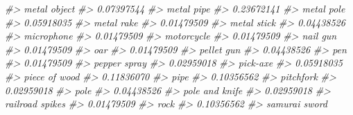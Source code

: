 \documentclass[
]{krantz}
\makeatletter
\newenvironment{Shaded}{\begin{snugshade}}{\end{snugshade}}
\newcommand{\CommentTok}[1]{\textcolor[rgb]{0.37,0.37,0.37}{\textit{#1}}}
\newenvironment{kframe}{%
\medskip{}
\setlength{\fboxsep}{.8em}
 \def\at@end@of@kframe{}%
 \ifinner\ifhmode%
  \def\at@end@of@kframe{\end{minipage}}%
  \begin{minipage}{\columnwidth}%
 \fi\fi%
 \def\FrameCommand##1{\hskip\@totalleftmargin \hskip-\fboxsep
 \colorbox{shadecolor}{##1}\hskip-\fboxsep
     \hskip-\linewidth \hskip-\@totalleftmargin \hskip\columnwidth}%
 \MakeFramed {\advance\hsize-\width
   \@totalleftmargin\z@ \linewidth\hsize
   \@setminipage}}%
 {\par\unskip\endMakeFramed%
 \at@end@of@kframe}
\renewenvironment{Shaded}{\begin{kframe}}{\end{kframe}}
\makeatother
\begin{document}
\begin{Shaded}
\begin{Highlighting}[]
\CommentTok{\#\textgreater{}                     metal object }
\CommentTok{\#\textgreater{}                       0.07397544 }
\CommentTok{\#\textgreater{}                       metal pipe }
\CommentTok{\#\textgreater{}                       0.23672141 }
\CommentTok{\#\textgreater{}                       metal pole }
\CommentTok{\#\textgreater{}                       0.05918035 }
\CommentTok{\#\textgreater{}                       metal rake }
\CommentTok{\#\textgreater{}                       0.01479509 }
\CommentTok{\#\textgreater{}                      metal stick }
\CommentTok{\#\textgreater{}                       0.04438526 }
\CommentTok{\#\textgreater{}                       microphone }
\CommentTok{\#\textgreater{}                       0.01479509 }
\CommentTok{\#\textgreater{}                       motorcycle }
\CommentTok{\#\textgreater{}                       0.01479509 }
\CommentTok{\#\textgreater{}                         nail gun }
\CommentTok{\#\textgreater{}                       0.01479509 }
\CommentTok{\#\textgreater{}                              oar }
\CommentTok{\#\textgreater{}                       0.01479509 }
\CommentTok{\#\textgreater{}                       pellet gun }
\CommentTok{\#\textgreater{}                       0.04438526 }
\CommentTok{\#\textgreater{}                              pen }
\CommentTok{\#\textgreater{}                       0.01479509 }
\CommentTok{\#\textgreater{}                     pepper spray }
\CommentTok{\#\textgreater{}                       0.02959018 }
\CommentTok{\#\textgreater{}                         pick{-}axe }
\CommentTok{\#\textgreater{}                       0.05918035 }
\CommentTok{\#\textgreater{}                    piece of wood }
\CommentTok{\#\textgreater{}                       0.11836070 }
\CommentTok{\#\textgreater{}                             pipe }
\CommentTok{\#\textgreater{}                       0.10356562 }
\CommentTok{\#\textgreater{}                        pitchfork }
\CommentTok{\#\textgreater{}                       0.02959018 }
\CommentTok{\#\textgreater{}                             pole }
\CommentTok{\#\textgreater{}                       0.04438526 }
\CommentTok{\#\textgreater{}                   pole and knife }
\CommentTok{\#\textgreater{}                       0.02959018 }
\CommentTok{\#\textgreater{}                  railroad spikes }
\CommentTok{\#\textgreater{}                       0.01479509 }
\CommentTok{\#\textgreater{}                             rock }
\CommentTok{\#\textgreater{}                       0.10356562 }
\CommentTok{\#\textgreater{}                    samurai sword }

\end{Highlighting}
\end{Shaded}
\end{document}
